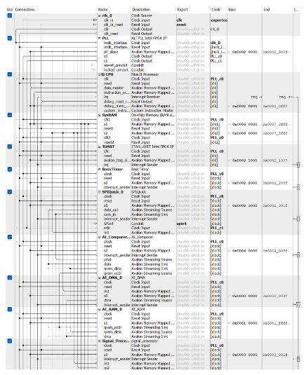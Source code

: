 \documentclass[
    left=2.5cm,         %
    right=2.5cm,        %
    top=2.5cm,          %
    bottom=3cm,         %
    bindingoffset=6mm,  %
    nohyphenation=true %
]{eiti/eiti-thesis} %
\begin{document}



\listoffigures              %

\newpage
{}

\FloatBarrier %
\begin{figure}[h]
	\centering
	\includegraphics[width=0.99\textwidth]{platform1.png}
\end{figure}
\FloatBarrier %
\end{document}
